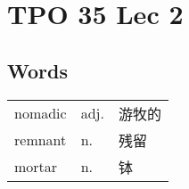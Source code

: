 \section{TPO 35 Lec 2}

\subsection{Words}

\begin{tabular}{lll}
    nomadic & adj. & 游牧的 \\
    remnant & n.   & 残留  \\
    mortar  & n.   & 钵   \\
\end{tabular}
